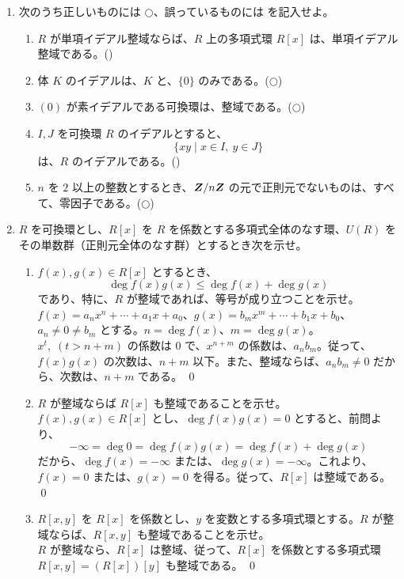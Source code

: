 \begin{enumerate}
\item 次のうち正しいものには $\bigcirc$、誤っているものには \bigx を記入せよ。
     \begin{enumerate}
     \item $R$ が単項イデアル整域ならば、$R$ 上の多項式環 $R[x]$ は、単項イデアル整域である。\hfill (\bigx)
     \item 体 $K$ のイデアルは、$K$ と、$\{0\}$ のみである。\hfill($\bigcirc$)
     \item $(0)$ が素イデアルである可換環は、整域である。\hfill($\bigcirc$)
     \item $I, J$ を可換環 $R$ のイデアルとすると、
     $$\{xy\mid x\in I, \:y\in J\}$$
     は、$R$ のイデアルである。\hfill (\bigx)
     \item $n$ を $2$ 以上の整数とするとき、$\mbox{\boldmath $Z$}/n\mbox{\boldmath $Z$}$ の元で正則元でないものは、すべて、零因子である。\hfill($\bigcirc$)
     \end{enumerate}

\item $R$ を可換環とし、$R[x]$ を $R$ を係数とする多項式全体のなす環、$U(R)$ をその単数群（正則元全体のなす群）とするとき次を示せ。
     \begin{enumerate}
     \item $f(x), g(x)\in R[x]$ とするとき、
     $$\deg f(x)g(x) \leq \deg f(x) + \deg g(x)$$
     であり、特に、$R$ が整域であれば、等号が成り立つことを示せ。\\
     \sol
     $f(x) = a_nx^n + \cdots + a_1x + a_0$、$g(x) = b_mx^m + \cdots + b_1x + b_0$、$a_n\neq 0 \neq b_m$ とする。$n = \deg f(x)$、$m = \deg g(x)$。$x^t, \;(t>n+m)$ の係数は 0 で、$x^{n+m}$ の係数は、$a_nb_m$。従って、$f(x)g(x)$ の次数は、$n+m$ 以下。また、整域ならば、$a_nb_m\neq 0$ だから、次数は、$n+m$ である。
     \qed
     
     \item $R$ が整域ならば $R[x]$ も整域であることを示せ。\\
     \sol
     $f(x), g(x)\in R[x]$ とし、$\deg f(x)g(x) = 0$ とすると、前問より、
     $$-\infty = \deg 0 = \deg f(x)g(x) = \deg f(x) + \deg g(x)$$
     だから、$\deg f(x) = -\infty$ または、$\deg g(x) = -\infty$。これより、$f(x) = 0$ または、$g(x) = 0$ を得る。従って、$R[x]$ は整域である。
     \qed
     
     \item $R[x,y]$ を $R[x]$ を係数とし、$y$ を変数とする多項式環とする。$R$ が整域ならば、$R[x,y]$ も整域であることを示せ。\\
     \sol
     $R$ が整域なら、$R[x]$ は整域、従って、$R[x]$ を係数とする多項式環 $R[x,y] = (R[x])[y]$ も整域である。
     \qed
     

\end{enumerate}
\end{enumerate}
